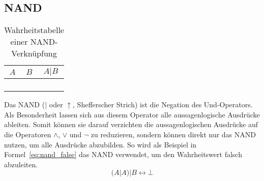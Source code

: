 \subsection{NAND}
%
\begin{table}[ht]
 \begin{center}
  \begin{tabular}{cc|c}
   \hline
    $A$ & $B$ & $A | B$ \\
   \hline \hline
    \F  & \F  & \T \\
    \F  & \T  & \T \\
    \T  & \F  & \T \\
    \T  & \T  & \F \\
  \end{tabular}
  \caption{Wahrheitstabelle einer NAND-Verknüpfung}
  \label{fig:nand_operator}
 \end{center}
\end{table}
%
Das NAND ($|$ oder $\uparrow$, Shefferscher Strich) ist die Negation des Und-Operators. Als Besonderheit lassen sich aus diesem Operator alle aussagenlogische Ausdrücke ableiten. Somit können sie darauf verzichten die aussagenlogischen Ausdrücke auf die Operatoren $\land$, $\lor$ und $\neg$ zu reduzieren, sondern können direkt nur das NAND nutzen, um alle Ausdrücke abzubilden. So wird als Beispiel in Formel~\ref{eq:nand_false} das NAND verwendet, um den Wahrheitswert falsch abzuleiten.
\begin{equation}
 \label{eq:nand_false}
  (A | A) | B \leftrightarrow \bot
\end{equation}
%
